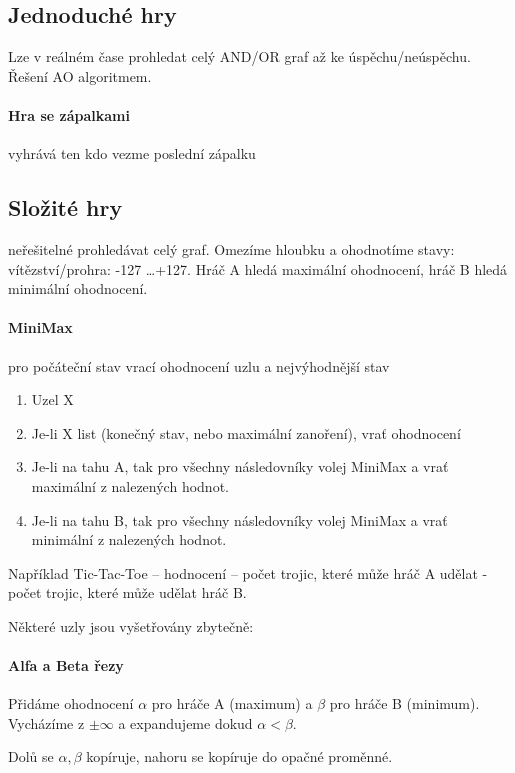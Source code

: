 \documentclass[a4wide]{report}
\begin{document}
\subsection{Jednoduché hry}

Lze v reálném čase prohledat celý AND/OR graf až ke úspěchu/neúspěchu. Řešení AO algoritmem.

\paragraph{Hra se zápalkami}

vyhrává ten kdo vezme poslední zápalku

\subsection{Složité hry}

neřešitelné prohledávat celý graf. Omezíme hloubku a ohodnotíme stavy: vítězství/prohra: -127 \dots +127. Hráč A hledá maximální ohodnocení, hráč B hledá minimální ohodnocení.

\paragraph{MiniMax} pro počáteční stav vrací ohodnocení uzlu a nejvýhodnější stav
\begin{enumerate}
	\item Uzel X
	\item Je-li X list (konečný stav, nebo maximální zanoření), vrať ohodnocení
	\item Je-li na tahu A, tak pro všechny následovníky volej MiniMax a vrať maximální z nalezených hodnot.
	\item Je-li na tahu B, tak pro všechny následovníky volej MiniMax a vrať minimální z nalezených hodnot.
\end{enumerate}

Například Tic-Tac-Toe -- hodnocení -- počet trojic, které může hráč A udělat - počet trojic, které může udělat hráč B.

Některé uzly jsou vyšetřovány zbytečně:

\paragraph{Alfa a Beta řezy}
Přidáme ohodnocení $\alpha$ pro hráče A (maximum) a $\beta$ pro hráče B (minimum). Vycházíme z $\pm \infty$ a expandujeme dokud $ \alpha < \beta$.

Dolů se $\alpha, \beta$ kopíruje, nahoru se kopíruje do opačné proměnné.
\end{document}
